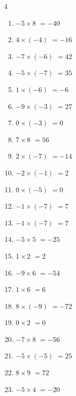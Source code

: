 \begin{multicols}{4}
\begin{enumerate}
  \item $-5\times 8$
        $=-40$

  \item $4\times (-4)$
        $=-16$

  \item $-7\times (-6)$
        $=42$

  \item $-5\times (-7)$
        $=35$

  \item $1\times (-6)$
        $=-6$

  \item $-9\times (-3)$
        $=27$

  \item $0\times (-3)$
        $=0$

  \item $7\times 8$
        $=56$

  \item $2\times (-7)$
        $=-14$

  \item $-2\times (-1)$
        $=2$

  \item $0\times (-5)$
        $=0$

  \item $-1\times (-7)$
        $=7$

  \item $-1\times (-7)$
        $=7$

  \item $-5\times 5$
        $=-25$

  \item $1\times 2$
        $=2$

  \item $-9\times 6$
        $=-54$

  \item $1\times 6$
        $=6$

  \item $8\times (-9)$
        $=-72$

  \item $0\times 2$
        $=0$

  \item $-7\times 8$
        $=-56$

  \item $-5\times (-5)$
        $=25$

  \item $8\times 9$
        $=72$

  \item $-5\times 4$
        $=-20$


\end{enumerate}
\end{multicols}
